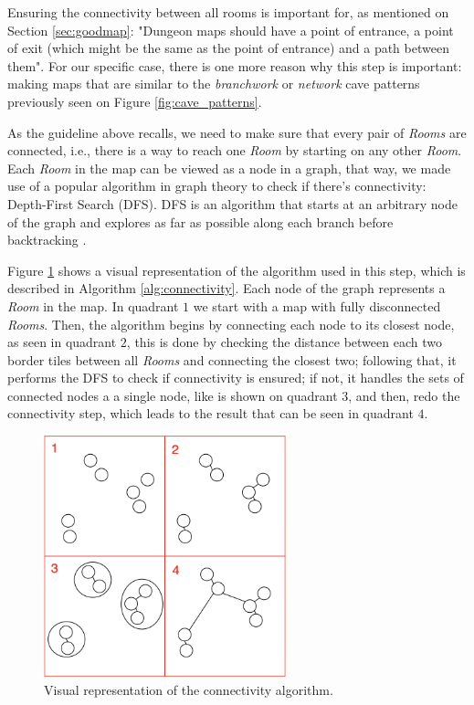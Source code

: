 Ensuring the connectivity between all rooms is important for, as mentioned on Section \ref{sec:goodmap}: "Dungeon maps should have a point of entrance, a point of exit (which might be the same as the point of entrance) and a path between them". For our specific case, there is one more reason why this step is important: making maps that are similar to the \emph{branchwork} or \emph{network} cave patterns previously seen on Figure \ref{fig:cave_patterns}.

As the guideline above recalls, we need to make sure that every pair of \emph{Rooms} are connected, i.e., there is a way to reach one \emph{Room} by starting on any other \emph{Room}. Each \emph{Room} in the map can be viewed as a node in a graph, that way, we made use of a popular algorithm in graph theory to check if there's connectivity: Depth-First Search (DFS). DFS is an algorithm that starts at an arbitrary node of the graph and explores as far as possible along each branch before backtracking \cite{even:2011}.

Figure \ref{fig:connectivity} shows a visual representation of the algorithm used in this step, which is described in Algorithm  \ref{alg:connectivity}. Each node of the graph represents a \emph{Room} in the map. In quadrant \(1\) we start with a map with fully disconnected \emph{Rooms}. Then, the algorithm begins by connecting each node to its closest node, as seen in quadrant \(2\), this is done by checking the distance between each two border tiles between all \emph{Rooms} and connecting the closest two; following that, it performs the DFS to check if connectivity is ensured; if not, it handles the sets of connected nodes a a single node, like is shown on quadrant \(3\), and then, redo the connectivity step, which leads to the result that can be seen in quadrant \(4\).

\begin{figure}[h]
    \caption{Visual representation of the connectivity algorithm.}
    \centerline{\includegraphics[width=7cm]{images/development/graph_connect.png}}
    \label{fig:connectivity}
\end{figure}

